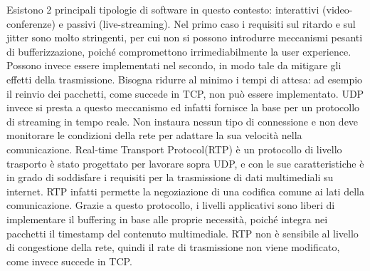 Esistono 2 principali tipologie di software in questo contesto: interattivi (video-conferenze) e passivi (live-streaming). Nel primo caso i requisiti sul ritardo
e sul jitter sono molto stringenti, per cui non si possono introdurre meccanismi pesanti di bufferizzazione, poiché compromettono irrimediabilmente la user experience. Possono invece essere implementati nel secondo, in modo tale da mitigare gli effetti della trasmissione. Bisogna ridurre al minimo i tempi di attesa: ad esempio il reinvio dei pacchetti, come succede in TCP, non può essere implementato. UDP invece si presta a questo meccanismo ed infatti fornisce la base per un protocollo di streaming in tempo reale. Non instaura nessun tipo di connessione e non deve monitorare le condizioni della rete per adattare la sua velocità nella comunicazione. Real-time Transport Protocol(RTP) è un protocollo di livello trasporto\cite{a10rfc3550}%
è stato progettato per lavorare sopra UDP, e con le sue caratteristiche è in grado di soddisfare i requisiti per la trasmissione di dati multimediali su internet. RTP infatti permette la negoziazione di una codifica comune ai lati della comunicazione. Grazie a questo protocollo, i livelli applicativi sono liberi di implementare il buffering in base alle proprie necessità, poiché integra nei pacchetti il timestamp del contenuto multimediale. RTP non è sensibile al livello di congestione della rete, quindi il rate di trasmissione non viene modificato, come invece succede in TCP. %

